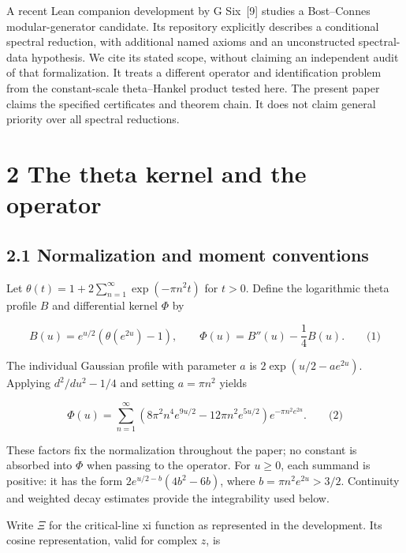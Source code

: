 \documentclass[
  11pt,
]{article}
\begin{document}
A recent Lean companion development by G Six~{[}9{]} studies a Bost--Connes modular-generator candidate. Its repository explicitly describes a conditional spectral reduction, with additional named axioms and an unconstructed spectral-data hypothesis. We cite its stated scope, without claiming an independent audit of that formalization. It treats a different operator and identification problem from the constant-scale theta--Hankel product tested here. The present paper claims the specified certificates and theorem chain. It does not claim general priority over all spectral reductions.

\hypertarget{the-theta-kernel-and-the-operator}{%
\section{2 The theta kernel and the operator}\label{the-theta-kernel-and-the-operator}}

\hypertarget{normalization-and-moment-conventions}{%
\subsection{2.1 Normalization and moment conventions}\label{normalization-and-moment-conventions}}

Let \(\theta(t) = 1 + 2\sum_{n = 1}^{\infty}\exp\left( - \pi n^{2}t \right)\) for \(t > 0\). Define the logarithmic theta profile \(B\) and differential kernel \(\Phi\) by

\[B(u) = e^{u/2}\left( \theta\left( e^{2u} \right) - 1 \right),\quad\quad\Phi(u) = B''(u) - \frac{1}{4}B(u).\quad\quad\text{(1)}\]

The individual Gaussian profile with parameter \(a\) is \(2\exp\left( u/2 - ae^{2u} \right)\). Applying \(d^{2}/du^{2} - 1/4\) and setting \(a = \pi n^{2}\) yields

\[\Phi(u) = \sum_{n = 1}^{\infty}\left( 8\pi^{2}n^{4}e^{9u/2} - 12\pi n^{2}e^{5u/2} \right)e^{- \pi n^{2}e^{2u}}.\quad\quad\text{(2)}\]

These factors fix the normalization throughout the paper; no constant is absorbed into \(\Phi\) when passing to the operator. For \(u \geq 0\), each summand is positive: it has the form \(2e^{u/2 - b}\left( 4b^{2} - 6b \right)\), where \(b = \pi n^{2}e^{2u} > 3/2\). Continuity and weighted decay estimates provide the integrability used below.

Write \(\Xi\) for the critical-line xi function as represented in the development. Its cosine representation, valid for complex \(z\), is
\end{document}
